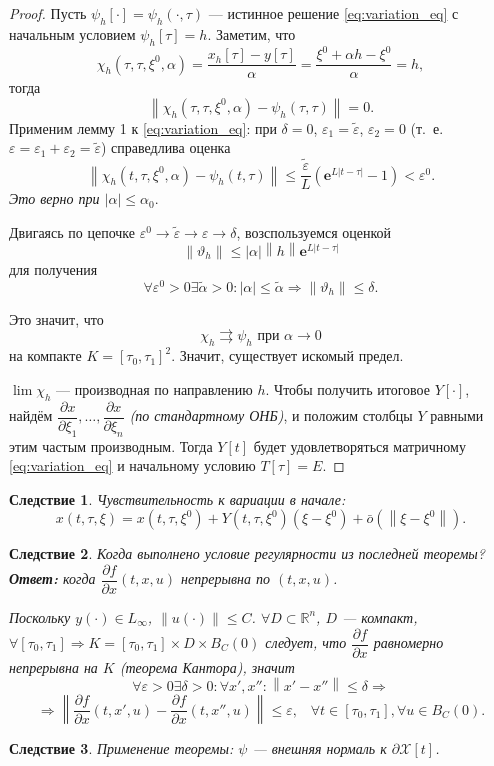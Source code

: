\documentclass[12pt, a4paper]{article}
\theoremstyle{rusdef}
\newtheorem{corol}{Следствие}
\newcommand\abs[1]{\left\lvert #1 \right\rvert} %
\newcommand{\R}{\ensuremath{\mathbb{R}}} %
\newcommand{\e}{\mathbf{e}}
\renewcommand{\d}{\partial} %
\newcommand{\norm}[1]{\left\lVert #1 \right\rVert} %
\DeclareMathOperator*{\thus}{\Rightarrow} %
\begin{document}
\begin{proof}
Пусть $\psi_h[\cdot] = \psi_h(\cdot, \tau)$ --- истинное решение \eqref{eq:variation_eq} с начальным условием $\psi_h[\tau] = h$.
Заметим, что
$$
\chi_h(\tau, \tau, \xi^0, \alpha) = \dfrac{x_h[\tau] - y[\tau]}{\alpha} = \dfrac{\xi^0 + \alpha h - \xi^0}{\alpha} = h,
$$
тогда
$$
\norm{\chi_h(\tau, \tau, \xi^0, \alpha) - \psi_h(\tau, \tau)} = 0.
$$
Применим лемму 1 к \eqref{eq:variation_eq}: при $\delta = 0$, $\varepsilon_1 = \tilde{\varepsilon}$, $\varepsilon_2 = 0$ (т.~е. $\varepsilon = \varepsilon_1 + \varepsilon_2 = \tilde{\varepsilon}$) справедлива оценка
$$
\norm{\chi_h(t, \tau, \xi^0, \alpha) - \psi_h(t, \tau)} \leqslant \dfrac{\tilde{\varepsilon}}{L} \left( \e^{L \abs{t - \tau}} - 1 \right) < \varepsilon^0.
$$
\textit{Это верно при $\abs{\alpha} \leqslant \alpha_0$}.

Двигаясь по цепочке $\varepsilon^0 \to \tilde{\varepsilon} \to \varepsilon \to \delta$, возспользуемся оценкой
$$
\norm{\vartheta_h} \leqslant \abs{\alpha} \norm{h} \e^{L\abs{t - \tau}}
$$
для получения
$$
\forall \varepsilon^0 > 0 \exists \tilde{\alpha} > 0 \colon \abs{\alpha} \leqslant \tilde{\alpha} \thus \norm{\vartheta_h} \leqslant \delta.
$$

Это значит, что
$$
\chi_h \rightrightarrows \psi_h \text{ при } \alpha \to 0
$$
на компакте $K = [\tau_0, \tau_1]^2$. Значит, существует искомый предел.

$\lim \chi_h$ --- производная по направлению $h$. Чтобы получить итоговое $Y[\cdot]$, найдём $\dfrac{\d x}{\d \xi_1}, \ldots, \dfrac{\d x}{\d \xi_n}$ \textit{(по стандартному ОНБ)}, и положим столбцы $Y$ равными этим частым производным. Тогда $Y[t]$ будет удовлетворяться матричному \eqref{eq:variation_eq} и начальному условию $T[\tau] = E$.
\end{proof}

\begin{corol}
Чувствительность к вариации в начале:
$$
x(t, \tau, \xi) = x(t, \tau, \xi^0) + Y(t, \tau, \xi^0)(\xi - \xi^0) + \bar{o}(\norm{\xi - \xi^0}).
$$
\end{corol}

\begin{corol}
Когда выполнено условие регулярности из последней теоремы?\\
\textbf{Ответ:} когда $\dfrac{\d f}{\d x}(t,x,u)$ непрерывна по $(t,x,u)$.

Поскольку $y(\cdot) \in L_{\infty}$, $\norm{u(\cdot)} \leqslant C$.
$\forall D \subset \R^n$, $D$ --- компакт, $\forall [\tau_0, \tau_1] \thus K = [\tau_0, \tau_1] \times D \times B_C(0)$ следует, что $\dfrac{\d f}{\d x}$ равномерно непрерывна на $K$ (теорема Кантора), значит
$$
\forall \varepsilon > 0 \exists \delta > 0 : \forall x', x'' \colon \norm{x' - x''} \leqslant \delta \thus
$$
$$
\thus \norm{ \dfrac{\d f}{\d x}(t, x', u) - \dfrac{\d f}{\d x}(t, x'', u) } \leqslant \varepsilon, \;\;\; \forall t \in [\tau_0, \tau_1], \forall u \in B_C(0).
$$
\end{corol}

\begin{corol}
Применение теоремы: $\psi$ --- внешняя нормаль к $\d \mathscr{X}[t]$.
\end{corol}
\end{document}
